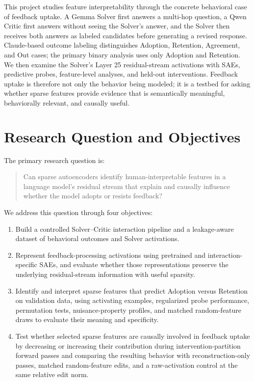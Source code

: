 This project studies feature interpretability through the concrete behavioral
case of feedback uptake. A Gemma Solver first answers a multi-hop question, a
Qwen Critic first answers without seeing the Solver's answer, and the Solver
then receives both answers as labeled candidates before generating a revised
response. Claude-based outcome labeling distinguishes Adoption, Retention,
Agreement, and Out cases; the primary binary analysis uses only Adoption and
Retention. We then examine the Solver's Layer 25 residual-stream activations
with SAEs, predictive probes, feature-level analyses, and held-out
interventions. Feedback uptake is therefore not only the behavior being
modeled; it is a testbed for asking whether sparse features provide evidence
that is semantically meaningful, behaviorally relevant, and causally useful.

\section{Research Question and Objectives}

The primary research question is:

\begin{quote}
Can sparse autoencoders identify human-interpretable features in a language
model's residual stream that explain and causally influence whether the model
adopts or resists feedback?
\end{quote}

We address this question through four objectives:

\begin{enumerate}
    \item Build a controlled Solver--Critic interaction pipeline and a
    leakage-aware dataset of behavioral outcomes and Solver activations.

    \item Represent feedback-processing activations using pretrained and
    interaction-specific SAEs, and evaluate whether those representations
    preserve the underlying residual-stream information with useful sparsity.

    \item Identify and interpret sparse features that predict Adoption versus
    Retention on validation data, using activating examples, regularized probe
    performance, permutation tests, nuisance-property profiles, and matched
    random-feature draws to evaluate their meaning and specificity.

    \item Test whether selected sparse features are causally involved in
    feedback uptake by decreasing or increasing their contribution during
    intervention-partition forward passes and comparing the resulting behavior
    with reconstruction-only passes, matched random-feature edits, and a
    raw-activation control at the same relative edit norm.
\end{enumerate}

